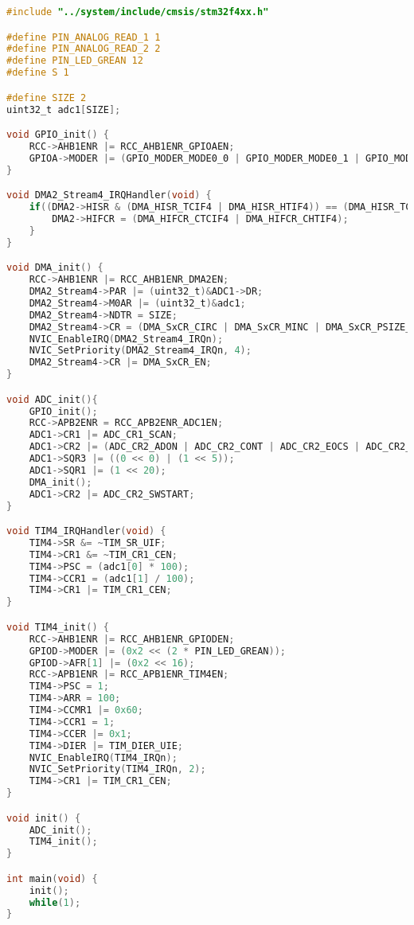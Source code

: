 \documentclass{bmstu}
\begin{document}
	\begingroup
	\fontsize{12pt}{12pt}\selectfont
	\begin{lstlisting}[language=C]
#include "../system/include/cmsis/stm32f4xx.h"

#define PIN_ANALOG_READ_1 1
#define PIN_ANALOG_READ_2 2
#define PIN_LED_GREAN 12
#define S 1

#define SIZE 2
uint32_t adc1[SIZE];

void GPIO_init() {
	RCC->AHB1ENR |= RCC_AHB1ENR_GPIOAEN;
	GPIOA->MODER |= (GPIO_MODER_MODE0_0 | GPIO_MODER_MODE0_1 | GPIO_MODER_MODE1_0 | GPIO_MODER_MODE1_1); 
}

void DMA2_Stream4_IRQHandler(void) {
	if((DMA2->HISR & (DMA_HISR_TCIF4 | DMA_HISR_HTIF4)) == (DMA_HISR_TCIF4 | DMA_HISR_HTIF4)) {
		DMA2->HIFCR = (DMA_HIFCR_CTCIF4 | DMA_HIFCR_CHTIF4);
	} 
}

void DMA_init() {
	RCC->AHB1ENR |= RCC_AHB1ENR_DMA2EN;
	DMA2_Stream4->PAR |= (uint32_t)&ADC1->DR;
	DMA2_Stream4->M0AR |= (uint32_t)&adc1;
	DMA2_Stream4->NDTR = SIZE;
	DMA2_Stream4->CR = (DMA_SxCR_CIRC | DMA_SxCR_MINC | DMA_SxCR_PSIZE_1 | DMA_SxCR_MSIZE_1 | DMA_SxCR_TCIE);
	NVIC_EnableIRQ(DMA2_Stream4_IRQn);
	NVIC_SetPriority(DMA2_Stream4_IRQn, 4);
	DMA2_Stream4->CR |= DMA_SxCR_EN;
}

void ADC_init(){
	GPIO_init();
	RCC->APB2ENR = RCC_APB2ENR_ADC1EN;
	ADC1->CR1 |= ADC_CR1_SCAN;
	ADC1->CR2 |= (ADC_CR2_ADON | ADC_CR2_CONT | ADC_CR2_EOCS | ADC_CR2_DMA | ADC_CR2_DDS);
	ADC1->SQR3 |= ((0 << 0) | (1 << 5));
	ADC1->SQR1 |= (1 << 20);
	DMA_init();
	ADC1->CR2 |= ADC_CR2_SWSTART;
}

void TIM4_IRQHandler(void) {
	TIM4->SR &= ~TIM_SR_UIF;
	TIM4->CR1 &= ~TIM_CR1_CEN;
	TIM4->PSC = (adc1[0] * 100);
	TIM4->CCR1 = (adc1[1] / 100);
	TIM4->CR1 |= TIM_CR1_CEN;
}

void TIM4_init() {
	RCC->AHB1ENR |= RCC_AHB1ENR_GPIODEN;
	GPIOD->MODER |= (0x2 << (2 * PIN_LED_GREAN));
	GPIOD->AFR[1] |= (0x2 << 16);
	RCC->APB1ENR |= RCC_APB1ENR_TIM4EN;
	TIM4->PSC = 1;
	TIM4->ARR = 100;
	TIM4->CCMR1 |= 0x60;
	TIM4->CCR1 = 1;
	TIM4->CCER |= 0x1;
	TIM4->DIER |= TIM_DIER_UIE;
	NVIC_EnableIRQ(TIM4_IRQn);
	NVIC_SetPriority(TIM4_IRQn, 2);
	TIM4->CR1 |= TIM_CR1_CEN;
}

void init() {
	ADC_init();
	TIM4_init();
}

int main(void) {
	init();
	while(1);
}		
	\end{lstlisting}
	\endgroup
\end{document}
